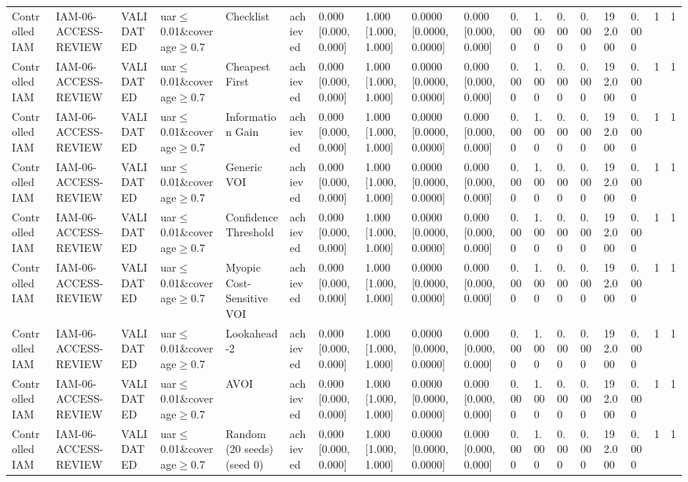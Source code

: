 \begin{table}[!ht]
{\begin{tabular}{llllllllllllllllll}
Controlled IAM & IAM-06-ACCESS-REVIEW & VALIDATED & uar$\le$0.01\&coverage$\ge$0.7 & Checklist & achieved & 0.000 [0.000, 0.000] & 1.000 [1.000, 1.000] & 0.0000 [0.0000, 0.0000] & 0.000 [0.000, 0.000] & 0.000 & 1.000 & 0.000 & 0.000 & 192.000 & 0.000 & 1 & 1 \\
Controlled IAM & IAM-06-ACCESS-REVIEW & VALIDATED & uar$\le$0.01\&coverage$\ge$0.7 & Cheapest First & achieved & 0.000 [0.000, 0.000] & 1.000 [1.000, 1.000] & 0.0000 [0.0000, 0.0000] & 0.000 [0.000, 0.000] & 0.000 & 1.000 & 0.000 & 0.000 & 192.000 & 0.000 & 1 & 1 \\
Controlled IAM & IAM-06-ACCESS-REVIEW & VALIDATED & uar$\le$0.01\&coverage$\ge$0.7 & Information Gain & achieved & 0.000 [0.000, 0.000] & 1.000 [1.000, 1.000] & 0.0000 [0.0000, 0.0000] & 0.000 [0.000, 0.000] & 0.000 & 1.000 & 0.000 & 0.000 & 192.000 & 0.000 & 1 & 1 \\
Controlled IAM & IAM-06-ACCESS-REVIEW & VALIDATED & uar$\le$0.01\&coverage$\ge$0.7 & Generic VOI & achieved & 0.000 [0.000, 0.000] & 1.000 [1.000, 1.000] & 0.0000 [0.0000, 0.0000] & 0.000 [0.000, 0.000] & 0.000 & 1.000 & 0.000 & 0.000 & 192.000 & 0.000 & 1 & 1 \\
Controlled IAM & IAM-06-ACCESS-REVIEW & VALIDATED & uar$\le$0.01\&coverage$\ge$0.7 & Confidence Threshold & achieved & 0.000 [0.000, 0.000] & 1.000 [1.000, 1.000] & 0.0000 [0.0000, 0.0000] & 0.000 [0.000, 0.000] & 0.000 & 1.000 & 0.000 & 0.000 & 192.000 & 0.000 & 1 & 1 \\
Controlled IAM & IAM-06-ACCESS-REVIEW & VALIDATED & uar$\le$0.01\&coverage$\ge$0.7 & Myopic Cost-Sensitive VOI & achieved & 0.000 [0.000, 0.000] & 1.000 [1.000, 1.000] & 0.0000 [0.0000, 0.0000] & 0.000 [0.000, 0.000] & 0.000 & 1.000 & 0.000 & 0.000 & 192.000 & 0.000 & 1 & 1 \\
Controlled IAM & IAM-06-ACCESS-REVIEW & VALIDATED & uar$\le$0.01\&coverage$\ge$0.7 & Lookahead-2 & achieved & 0.000 [0.000, 0.000] & 1.000 [1.000, 1.000] & 0.0000 [0.0000, 0.0000] & 0.000 [0.000, 0.000] & 0.000 & 1.000 & 0.000 & 0.000 & 192.000 & 0.000 & 1 & 1 \\
Controlled IAM & IAM-06-ACCESS-REVIEW & VALIDATED & uar$\le$0.01\&coverage$\ge$0.7 & AVOI & achieved & 0.000 [0.000, 0.000] & 1.000 [1.000, 1.000] & 0.0000 [0.0000, 0.0000] & 0.000 [0.000, 0.000] & 0.000 & 1.000 & 0.000 & 0.000 & 192.000 & 0.000 & 1 & 1 \\
Controlled IAM & IAM-06-ACCESS-REVIEW & VALIDATED & uar$\le$0.01\&coverage$\ge$0.7 & Random (20 seeds) (seed 0) & achieved & 0.000 [0.000, 0.000] & 1.000 [1.000, 1.000] & 0.0000 [0.0000, 0.0000] & 0.000 [0.000, 0.000] & 0.000 & 1.000 & 0.000 & 0.000 & 192.000 & 0.000 & 1 & 1 \\

\end{tabular}}
\end{table}
